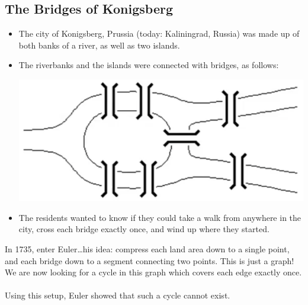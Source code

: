 \documentclass[10pt]{article}
\begin{document}
\subsection*{The Bridges of Konigsberg}
\begin{itemize}
    \item The city of Konigsberg, Prussia (today: Kaliningrad, Russia) was made up of both banks of a river, as well as two islands.
    \item The riverbanks and the islands were connected with bridges, as follows:
    \begin{center}
        \includegraphics*[scale=0.9]{W4_3.png}
    \end{center}
    \item The residents wanted to know if they could take a walk from anywhere in the city, cross each bridge exactly once, and wind up where they started.
\end{itemize}
In 1735, enter Euler\dots his idea: compress each land area down to a single point, and each bridge down to a segment connecting two points.  This is just a graph!  We are now looking for a cycle in this graph which covers each edge exactly once.\\\\
Using this setup, Euler showed that such a cycle cannot exist.
\end{document}
